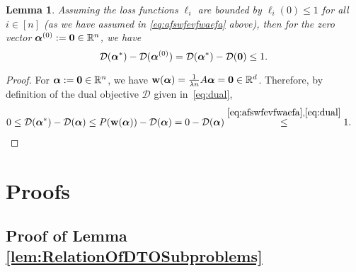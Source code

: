 \documentclass{article}
\newcommand{\R}{\mathbb{R}}                      %
\newcommand{\wv}{ {\bf w}}
\newcommand{\alphav}{ {\boldsymbol \alpha}}
\newcommand{\0}{ {\bf 0}}
\newcommand{\vc}[2]{#1^{(#2)}}                   %
\newcommand{\bD}{\mathcal{D}}
\theoremstyle{plain}
\newtheorem{lemma}[theorem]{Lemma}
\theoremstyle{definition}
\begin{document}
\begin{lemma}
\label{lemma:asfewfawfcda}
Assuming the loss functions $\ell_i$ are bounded by $\ell_i(0) \leq 1$ for all $i\in[n]$ (as we have assumed in \eqref{eq:afswfevfwaefa} above), then 
for the zero vector $\vc{\alphav}{0}
 := {\bf 0}\in \R^n$, we have
\begin{equation}
\label{eq:afjfjaoefvcwa}
\bD(\alphav^*)
 - \bD(\vc{\alphav}{0})
= 
\bD(\alphav^*)
-\bD({\bf 0})
 \leq 1.
 \end{equation}
\end{lemma}
\begin{proof}
For $\alphav := {\bf 0}\in \R^n$, we have
$\wv(\alphav) = 
\frac1{\lambda n}
A \alphav 
 = {\bf 0} \in \R^d$.
 Therefore, by definition of the dual objective $\bD$ given in~\eqref{eq:dual},
\begin{align*}
0 &\leq \bD(\alphav^*)
-\bD(\alphav)
\leq P(\wv(\alphav)) - \bD(\alphav)
 = 0 - \bD(\alphav)
 \overset{\eqref{eq:afswfevfwaefa},\eqref{eq:dual}
}{\leq} 1. \qedhere
\end{align*} 
\end{proof}




%
\section{Proofs}


\subsection{Proof of Lemma \ref{lem:RelationOfDTOSubproblems}}
  
\end{document}
